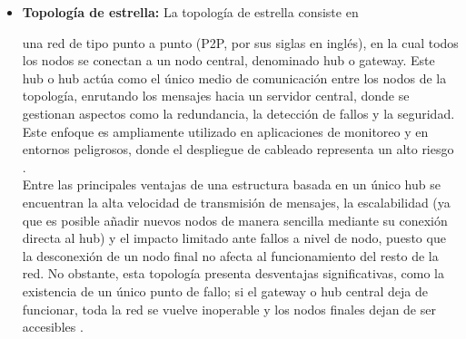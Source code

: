 \begin{itemize}
      \item \textbf{Topología de estrella:} La topología de estrella consiste en









            una red de tipo punto a punto (P2P, por sus siglas en inglés), en la
            cual todos los nodos se conectan a un nodo central, denominado hub o
            gateway. Este hub o hub actúa como el único  medio  de  comunicación
            entre los nodos de la topología, enrutando  los  mensajes  hacia  un
            servidor central, donde se gestionan aspectos como  la  redundancia,
            la detección de fallos y la seguridad. Este enfoque  es  ampliamente
            utilizado en aplicaciones de monitoreo  y  en  entornos  peligrosos,
            donde  el  despliegue  de  cableado  representa   un   alto   riesgo
            \parencite[]{chilamkurthy2022low}.\\ Entre las principales  ventajas
            de una estructura basada en un  único  hub  se  encuentran  la  alta
            velocidad de transmisión de mensajes, la escalabilidad  (ya  que  es
            posible añadir nuevos nodos de manera sencilla mediante su  conexión
            directa al hub) y el impacto limitado ante fallos a nivel  de  nodo,
            puesto  que  la  desconexión  de  un  nodo  final   no   afecta   al
            funcionamiento del resto de la  red.  No  obstante,  esta  topología
            presenta desventajas significativas, como la existencia de un  único
            punto de fallo; si el gateway o hub central deja de funcionar,  toda
            la red se vuelve  inoperable  y  los  nodos  finales  dejan  de  ser
            accesibles \parencite[]{chilamkurthy2022low}.


\end{itemize}
